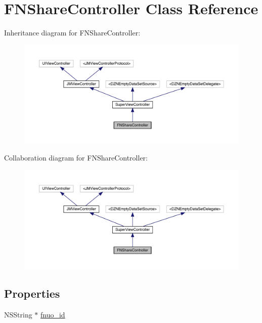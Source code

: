\hypertarget{interface_f_n_share_controller}{}\section{F\+N\+Share\+Controller Class Reference}
\label{interface_f_n_share_controller}


Inheritance diagram for F\+N\+Share\+Controller\+:\nopagebreak
\begin{figure}[H]
\begin{center}
\leavevmode
\includegraphics[width=350pt]{interface_f_n_share_controller__inherit__graph}
\end{center}
\end{figure}


Collaboration diagram for F\+N\+Share\+Controller\+:\nopagebreak
\begin{figure}[H]
\begin{center}
\leavevmode
\includegraphics[width=350pt]{interface_f_n_share_controller__coll__graph}
\end{center}
\end{figure}
\subsection*{Properties}
\begin{DoxyCompactItemize}
\item 
N\+S\+String $\ast$ \mbox{\hyperlink{interface_f_n_share_controller_a4f25a598502b0e8fb06d66076753b3d3}{fnuo\+\_\+id}}
\end{DoxyCompactItemize}
